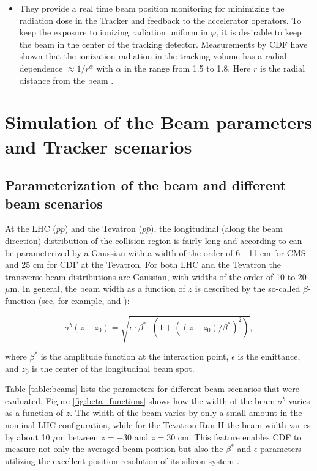 \documentclass{cmspaper}
\begin{document}
\begin{itemize}
\item   They provide a real time beam position monitoring for minimizing the radiation dose in the Tracker and feedback to the accelerator operators. 
To keep the exposure to ionizing radiation uniform in 
$\varphi$, it is desirable to keep the beam in the center of the tracking detector. 
Measurements by CDF have shown that the ionization radiation in the 
tracking volume has a radial dependence 
$\approx 1/r^{\alpha}$ with $\alpha$
in the range from 1.5 to  1.8. Here $r$ is the radial distance from the beam \cite{damage}. 

  

\end{itemize} 
\section{\label{sec:beamtrack}Simulation of the Beam parameters and Tracker scenarios}

\subsection{\label{sect:param}Parameterization of the beam and different beam scenarios}
At the LHC ($p p $) and the Tevatron  ($p \bar{p}$),
 the longitudinal (along the beam direction) distribution of the collision region 
is fairly long and according to \cite{BEAMPHYSIC}  can be parameterized by a Gaussian with a width of the order of  6 - 11 cm for CMS
and 25 cm for CDF at the Tevatron. 
For both LHC and the Tevatron the transverse beam distributions are Gaussian, with widths of the order of 10 to 20 $\mu$m.
In general, the beam width as a  function of $z$ is described by the so-called $\beta$-function  (see, for example, \cite{BEAMPHYSIC}
and \cite{BEAMCON}):

\begin{equation}
\sigma^{b}(z-z_0) = \sqrt{\epsilon \cdot \beta^* \cdot (1+((z-z_0)/\beta^*)^2)},
\label{betafunction}
\end{equation}

\noindent where $\beta^*$ is the amplitude function at the interaction point,
$\epsilon$ is the emittance, and $z_0$ is the center of the longitudinal beam spot.

Table \ref{table:beams} lists the parameters for different beam scenarios that were evaluated.
Figure  \ref{fig:beta_functions}
shows how the width of the beam $\sigma^b$ varies as a function of $z$. The width
of the beam varies by only a small amount in the nominal LHC configuration, while for the Tevatron Run II the beam width varies by about 10 $\mu$m 
between $z=-30$ and $z=30$ cm. 
This feature enables CDF to measure not only the averaged beam position but also the $\beta^*$ and $\epsilon$ parameters utilizing the  
excellent position resolution of its silicon system \cite{ANAL} \cite{RunII}.
\end{document}
